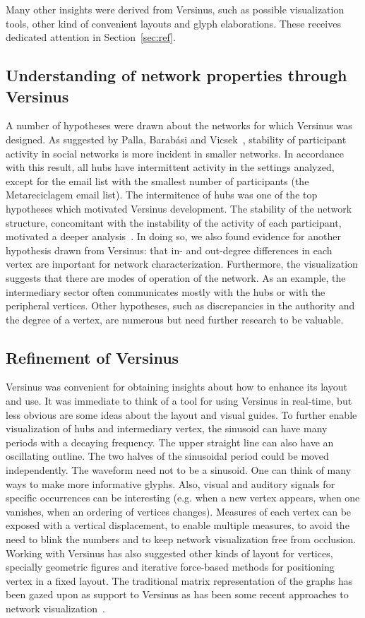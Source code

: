 Many other insights were derived from Versinus, such as possible visualization tools, other kind of convenient layouts and glyph elaborations.
These receives dedicated attention in Section~\ref{sec:ref}.

\subsection{Understanding of network properties through Versinus}
A number of hypotheses were drawn about the networks for which Versinus was designed.
As suggested by Palla, Barab\'asi and Vicsek~\cite{barabasiEvo}, stability of participant activity in social networks is more incident in smaller networks.
In accordance with this result, all hubs have intermittent activity in the settings analyzed, except for the email list with the smallest number of participants (the Metareciclagem email list).
The intermitence of hubs was one of the top hypotheses which motivated Versinus development.
The stability of the network structure, concomitant with the instability of the activity of each participant,
motivated a deeper analysis~\cite{evoSN}.
In doing so, we also found evidence for another hypothesis drawn from Versinus:
that in- and out-degree differences in each vertex are important for network characterization.
Furthermore, the visualization suggests that there are modes of operation of the network.
As an example, the intermediary sector often communicates mostly with the hubs or with the peripheral vertices.
Other hypotheses,
such as discrepancies in the authority and the degree of a vertex,
are numerous but need further research to be valuable.
 
\subsection{Refinement of Versinus}\label{sec:verref}
Versinus was convenient for obtaining insights about how to enhance its layout and use.
It was immediate to think of a tool for using Versinus
in real-time, but less obvious are some ideas about the layout and visual guides. 
To further enable visualization of hubs and intermediary vertex,
the sinusoid can have many periods 
with a decaying frequency.
The upper straight line can also have an oscillating outline.
The two halves of the sinusoidal period could be moved independently.
The waveform need not to be a sinusoid.
One can think of many ways to make more informative glyphs.
Also, visual and auditory signals for specific occurrences can be interesting
(e.g. when a new vertex appears, when one vanishes, when an ordering of vertices changes).
Measures of each vertex can be exposed with a vertical displacement,
to enable multiple measures, to avoid the need to blink the numbers and to keep network visualization free from occlusion.
Working with Versinus has also suggested other kinds of layout for vertices, 
specially geometric figures and iterative force-based methods for positioning vertex in a fixed layout.
The traditional matrix representation of the graphs has been gazed upon as support to Versinus 
as has been some recent approaches to network visualization~\cite{Viz1}.


